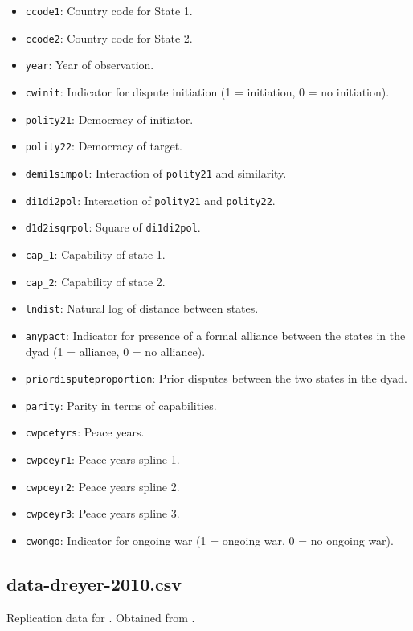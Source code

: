 \documentclass[12pt]{article}
\begin{document}
\begin{itemize}
  \item \texttt{ccode1}: Country code for State 1.
  \item \texttt{ccode2}: Country code for State 2.
  \item \texttt{year}: Year of observation.
  \item \texttt{cwinit}: Indicator for dispute initiation (1 = initiation, 0 = no initiation).
  \item \texttt{polity21}: Democracy of initiator.
  \item \texttt{polity22}: Democracy of target.
  \item \texttt{demi1simpol}: Interaction of \texttt{polity21} and similarity.
  \item \texttt{di1di2pol}: Interaction of \texttt{polity21} and \texttt{polity22}.
  \item \texttt{d1d2isqrpol}: Square of \texttt{di1di2pol}.
  \item \texttt{cap\_1}: Capability of state 1.
  \item \texttt{cap\_2}: Capability of state 2.
  \item \texttt{lndist}: Natural log of distance between states.
  \item \texttt{anypact}: Indicator for presence of a formal alliance between the states in the dyad (1 = alliance, 0 = no alliance).
  \item \texttt{priordisputeproportion}: Prior disputes between the two states in the dyad.
  \item \texttt{parity}: Parity in terms of capabilities.
  \item \texttt{cwpcetyrs}: Peace years.
  \item \texttt{cwpceyr1}: Peace years spline 1.
  \item \texttt{cwpceyr2}: Peace years spline 2.
  \item \texttt{cwpceyr3}: Peace years spline 3.
  \item \texttt{cwongo}: Indicator for ongoing war (1 = ongoing war, 0 = no ongoing war).
\end{itemize}

\subsection{data-dreyer-2010.csv}

Replication data for \citet{Dreyer:2010cu}.
Obtained from \citet{dreyer2010data}.
\end{document}
